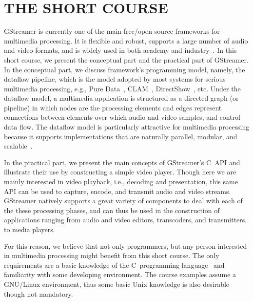 \documentclass{sig-alternate-05-2015}
\begin{document}
\printccsdesc
{}


\section*{THE SHORT COURSE}

\noindent
GStreamer is currently one of the main free/open-source frameworks for
multimedia processing.  It is flexible and robust, supports a large number
of audio and video formats, and is widely used in both academy and
industry~\cite{gstreamer-apps}.  In this short course, we present the
conceptual part and the practical part of GStreamer.  In the conceptual
part, we discuss framework's programming model, namely, the dataflow
pipeline, which is the model adopted by most systems for serious multimedia
processing, e.g., Pure Data~\cite{Puckette-M-S-2007},
CLAM~\cite{Amatriain-X-2008}, DirectShow~\cite{Chatterjee-A-1997}, etc.
Under the dataflow model, a multimedia application is structured as a
directed graph (or pipeline) in which nodes are the processing elements and
edges represent connections between elements over which audio and video
samples, and control data flow.  The dataflow model is particularly
attractive for multimedia processing because it supports implementations
that are naturally parallel, modular, and scalable~\cite{Yviquel-H-2014}.

In the practical part, we present the main concepts of GStreamer's C~API and
illustrate their use by constructing a simple video player.  Though here we
are mainly interested in video playback, i.e., decoding and presentation,
this same API can be used to capture, encode, and transmit audio and video
streams.  GStreamer natively supports a great variety of components to deal
with each of the these processing phases, and can thus be used in the
construction of applications ranging from audio and video editors,
transcoders, and transmitters, to media players.

For this reason, we believe that not only programmers, but any person
interested in multimedia processing might benefit from this short course.
The only requirements are a basic knowledge of the C~programming
language~\cite{Kernighan-B-W-1988} and familiarity with some developing
environment.  The course examples assume a GNU/Linux environment, thus some
basic Unix knowledge is also desirable though not mandatory.
\end{document}
